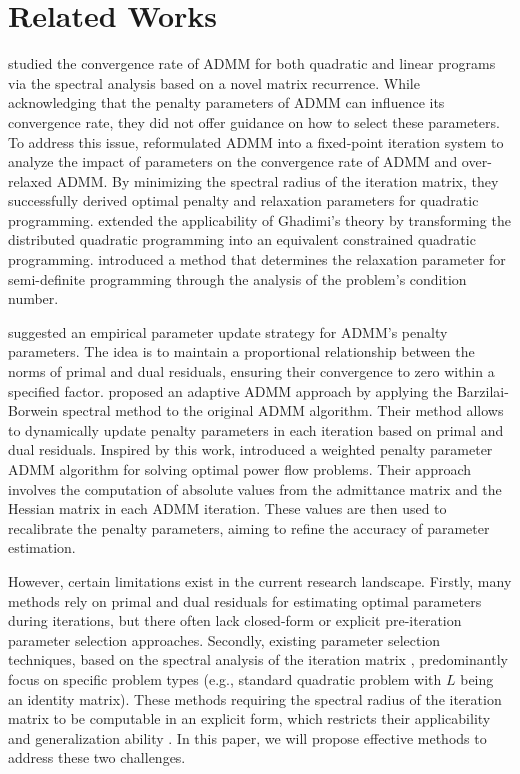 \documentclass[letterpaper]{article} %
\begin{document}
\section{Related Works}
\cite{boley2013local} studied the convergence rate of ADMM for both quadratic and linear programs via the spectral analysis based on a novel matrix recurrence. While acknowledging that the penalty parameters of ADMM can influence its convergence rate, they did not offer guidance on how to select these parameters. To address this issue, \cite{ghadimi2014optimal} reformulated ADMM into a fixed-point iteration system to analyze the impact of parameters on the convergence rate of ADMM and over-relaxed ADMM. By minimizing the spectral radius of the iteration matrix, they successfully derived optimal penalty and relaxation parameters for quadratic programming. \cite{teixeira2015admm} extended the applicability of Ghadimi's theory by transforming the distributed quadratic programming into an equivalent constrained quadratic programming. \cite{francca2016explicit} introduced a method that determines the relaxation parameter for semi-definite programming through the analysis of the problem's condition number.

\cite{boyd2011distributed} suggested an empirical parameter update strategy for ADMM's penalty parameters. The idea is to maintain a proportional relationship between the norms of primal and dual residuals, ensuring their convergence to zero within a specified factor. \cite{xu2017adaptive} proposed an adaptive ADMM approach by applying the Barzilai-Borwein spectral method to the original ADMM algorithm. Their method allows to dynamically update penalty parameters in each iteration based on primal and dual residuals. Inspired by this work, \cite{mavromatis2020auto} introduced a weighted penalty parameter ADMM algorithm for solving optimal power flow problems. Their approach involves the computation of absolute values from the admittance matrix and the Hessian matrix in each ADMM iteration. These values are then used to recalibrate the penalty parameters, aiming to refine the accuracy of parameter estimation.

However, certain limitations exist in the current research landscape. Firstly, many methods \cite{boyd2011distributed,xu2017adaptive,wohlberg2017admm,mhanna2018adaptive} rely on primal and dual residuals for estimating optimal parameters during iterations, but there often lack closed-form or explicit pre-iteration parameter selection approaches. Secondly, existing parameter selection techniques, based on the spectral analysis of the iteration matrix \cite{ghadimi2014optimal,francca2016explicit}, predominantly focus on specific problem types (e.g., standard quadratic problem with $L$ being an identity matrix). These methods requiring the spectral radius of the iteration matrix to be computable in an explicit form, which restricts their applicability and generalization ability \cite{stellato2020osqp}. In this paper, we will propose effective methods to address these two challenges.
\end{document}
